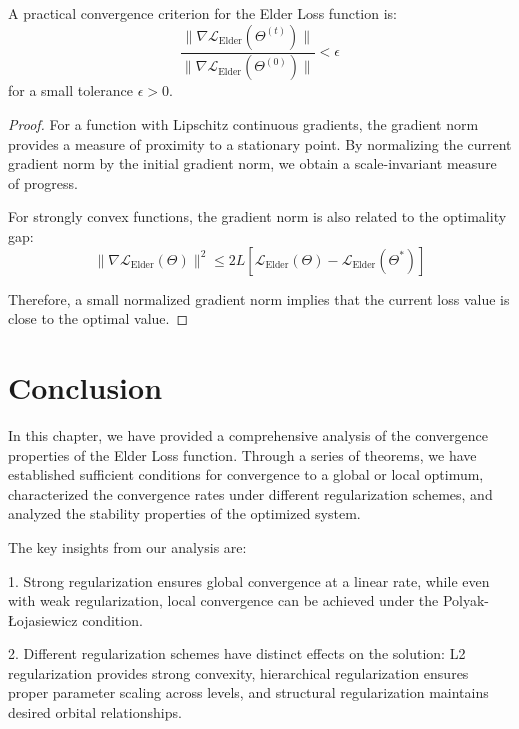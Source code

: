 \begin{theorem}
A practical convergence criterion for the Elder Loss function is:
\begin{equation}
\frac{\|\nabla \mathcal{L}_{\text{Elder}}(\Theta^{(t)})\|}{\|\nabla \mathcal{L}_{\text{Elder}}(\Theta^{(0)})\|} < \epsilon
\end{equation}
for a small tolerance $\epsilon > 0$.
\end{theorem}

\begin{proof}
For a function with Lipschitz continuous gradients, the gradient norm provides a measure of proximity to a stationary point. By normalizing the current gradient norm by the initial gradient norm, we obtain a scale-invariant measure of progress.

For strongly convex functions, the gradient norm is also related to the optimality gap:
\begin{equation}
\|\nabla \mathcal{L}_{\text{Elder}}(\Theta)\|^2 \leq 2L[\mathcal{L}_{\text{Elder}}(\Theta) - \mathcal{L}_{\text{Elder}}(\Theta^*)]
\end{equation}

Therefore, a small normalized gradient norm implies that the current loss value is close to the optimal value.
\end{proof}

\section{Conclusion}

In this chapter, we have provided a comprehensive analysis of the convergence properties of the Elder Loss function. Through a series of theorems, we have established sufficient conditions for convergence to a global or local optimum, characterized the convergence rates under different regularization schemes, and analyzed the stability properties of the optimized system.

The key insights from our analysis are:

1. Strong regularization ensures global convergence at a linear rate, while even with weak regularization, local convergence can be achieved under the Polyak-Łojasiewicz condition.

2. Different regularization schemes have distinct effects on the solution: L2 regularization provides strong convexity, hierarchical regularization ensures proper parameter scaling across levels, and structural regularization maintains desired orbital relationships.

